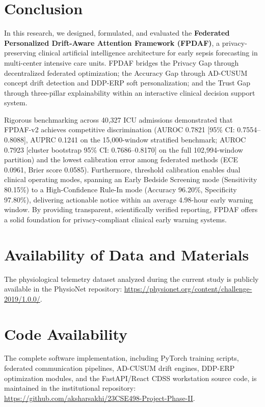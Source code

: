 \documentclass[10pt,a4paper,twocolumn,twoside]{article}
\begin{document}
\section{Conclusion}
In this research, we designed, formulated, and evaluated the \textbf{Federated Personalized Drift-Aware Attention Framework (FPDAF)}, a privacy-preserving clinical artificial intelligence architecture for early sepsis forecasting in multi-center intensive care units. FPDAF bridges the Privacy Gap through decentralized federated optimization; the Accuracy Gap through AD-CUSUM concept drift detection and DDP-ERP soft personalization; and the Trust Gap through three-pillar explainability within an interactive clinical decision support system.

Rigorous benchmarking across 40,327 ICU admissions demonstrated that FPDAF-v2 achieves competitive discrimination (AUROC 0.7821 [95\% CI: 0.7554--0.8088], AUPRC 0.1241 on the 15,000-window stratified benchmark; AUROC 0.7923 [cluster bootstrap 95\% CI: 0.7686--0.8170] on the full 102,994-window partition) and the lowest calibration error among federated methods (ECE 0.0961, Brier score 0.0585). Furthermore, threshold calibration enables dual clinical operating modes, spanning an Early Bedside Screening mode (Sensitivity 80.15\%) to a High-Confidence Rule-In mode (Accuracy 96.20\%, Specificity 97.80\%), delivering actionable notice within an average 4.98-hour early warning window. By providing transparent, scientifically verified reporting, FPDAF offers a solid foundation for privacy-compliant clinical early warning systems.

\section*{Availability of Data and Materials}
The physiological telemetry dataset analyzed during the current study is publicly available in the PhysioNet repository: \url{https://physionet.org/content/challenge-2019/1.0.0/}.

\section*{Code Availability}
The complete software implementation, including PyTorch training scripts, federated communication pipelines, AD-CUSUM drift engines, DDP-ERP optimization modules, and the FastAPI/React CDSS workstation source code, is maintained in the institutional repository: \url{https://github.com/aksharsakhi/23CSE498-Project-Phase-II}.
\end{document}
